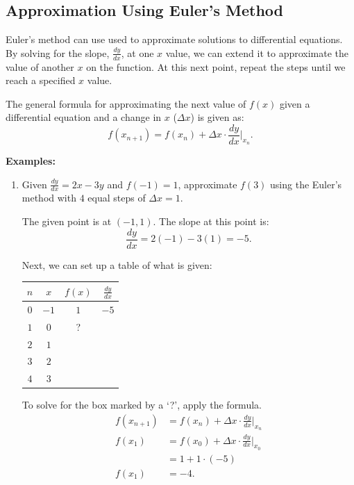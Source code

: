 \subsection{Approximation Using Euler's Method}
Euler's method can use used to approximate solutions to differential equations. By solving for the slope, $\frac{dy}{dx}$, at one $x$ value, we can extend it to approximate the value of another $x$ on the function. At this next point, repeat the steps until we reach a specified $x$ value.

The general formula for approximating the next value of $f(x)$ given a differential equation and a change in $x$ ($\Delta x$) is given as:
\[ f(x_{n + 1}) = f(x_n) + \Delta x \cdot \frac{dy}{dx} \Big|_{x_n}. \]

\noindent \textbf{Examples:}
\begin{enumerate}
	\item Given $\frac{dy}{dx} = 2x - 3y$ and $f(-1) = 1$, approximate $f(3)$ using the Euler's method with $4$ equal steps of $\Delta x = 1$.

	The given point is at $(-1, 1)$. The slope at this point is:
	\[ \frac{dy}{dx} = 2(-1) - 3(1) = -5. \]

	Next, we can set up a table of what is given:
	\begin{table}[H]
		\centering
		\begin{tabular}{|c|c|c|c|}
			\hline
			$n$ & $x$ & $f(x)$ & $\frac{dy}{dx}$ \\
			\hline \hline
			$0$ & $-1$ & $1$ & $-5$ \\
			\hline
			$1$ & $0$ & ? & \\
			\hline
			$2$ & $1$ & & \\
			\hline
			$3$ & $2$ & & \\
			\hline
			$4$ & $3$ & & \\
			\hline
		\end{tabular}
	\end{table}

	To solve for the box marked by a `?', apply the formula.
	\begin{align*}
		f(x_{n + 1}) &= f(x_n) + \Delta x \cdot \frac{dy}{dx} \Big|_{x_n} \\[5pt]
		f(x_1) &= f(x_0) + \Delta x \cdot \frac{dy}{dx} \Big|_{x_0} \\[5pt]
		&= 1 + 1 \cdot (-5) \\
		f(x_1) &= -4.
	\end{align*}


\end{enumerate}
